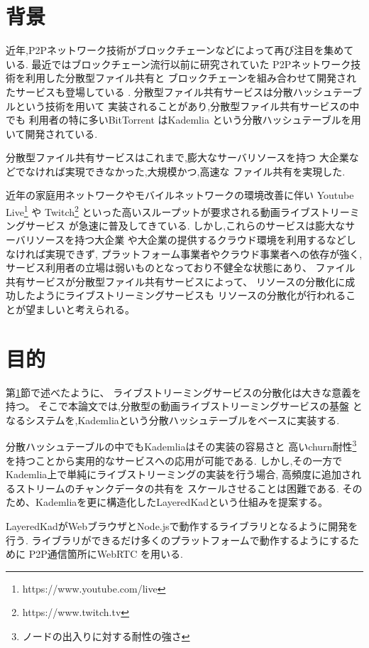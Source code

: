 \documentclass[sotsuron]{jcsie}
\begin{document}
\section{背景}
\label{sec:haikei}
近年,P2Pネットワーク技術がブロックチェーンなどによって再び注目を集めている.
最近ではブロックチェーン流行以前に研究されていた
P2Pネットワーク技術を利用した分散型ファイル共有と
ブロックチェーンを組み合わせて開発されたサービスも登場している
\cite{BitTorre1:online}.
分散型ファイル共有サービスは分散ハッシュテーブルという技術を用いて
実装されることがあり,分散型ファイル共有サービスの中でも
利用者の特に多いBitTorrent\cite{BitTorre59:online}
はKademlia\cite{maymounkov2002kademlia}\cite{高野祐輝2010nat}
という分散ハッシュテーブルを用いて開発されている.

分散型ファイル共有サービスはこれまで,膨大なサーバリソースを持つ
大企業などでなければ実現できなかった,大規模かつ,高速な
ファイル共有を実現した.

近年の家庭用ネットワークやモバイルネットワークの環境改善に伴い
Youtube Live\footnote{https://www.youtube.com/live} や 
Twitch\footnote{https://www.twitch.tv} 
といった高いスループットが要求される動画ライブストリーミングサービス
が急速に普及してきている.
しかし,これらのサービスは膨大なサーバリソースを持つ大企業
や大企業の提供するクラウド環境を利用するなどしなければ実現できず,
プラットフォーム事業者やクラウド事業者への依存が強く,
サービス利用者の立場は弱いものとなっており不健全な状態にあり、
ファイル共有サービスが分散型ファイル共有サービスによって、
リソースの分散化に成功したようにライブストリーミングサービスも
リソースの分散化が行われることが望ましいと考えられる。

\section{目的}
第\ref{sec:haikei}節で述べたように、
ライブストリーミングサービスの分散化は大きな意義を持つ。
そこで本論文では,分散型の動画ライブストリーミングサービスの基盤
となるシステムを,Kademliaという分散ハッシュテーブルをベースに実装する.

分散ハッシュテーブルの中でもKademliaはその実装の容易さと
高いchurn耐性\footnote{ノードの出入りに対する耐性の強さ}
を持つことから実用的なサービスへの応用が可能である.
しかし,その一方でKademlia上で単純にライブストリーミングの実装を行う場合,
高頻度に追加されるストリームのチャンクデータの共有を
スケールさせることは困難である.
そのため、Kademliaを更に構造化したLayeredKadという仕組みを提案する。

LayeredKadがWebブラウザとNode.jsで動作するライブラリとなるように開発を行う.
ライブラリができるだけ多くのプラットフォームで動作するようにするために
P2P通信箇所にWebRTC \cite{WebRTCHo80:online}
を用いる.
\end{document}
